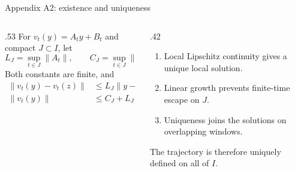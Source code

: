 \begin{frame}[t]{Appendix A2: existence and uniqueness}
\hypertarget{app:existence}{}
\begin{columns}[T,onlytextwidth]
  \begin{column}{.53\textwidth}
    For $v_t(y)=A_ty+B_t$ and compact $J\subset I$, let
    \begin{equation*}
      L_J=\sup_{t\in J}\|A_t\|,\qquad
      C_J=\sup_{t\in J}\|B_t\|.
    \end{equation*}
    Both constants are finite, and
    \begin{equation*}
      \begin{aligned}
        \|v_t(y)-v_t(z)\|&\leq L_J\|y-z\|,\\
        \|v_t(y)\|&\leq C_J+L_J\|y\|.
      \end{aligned}
    \end{equation*}
  \end{column}
  \begin{column}{.42\textwidth}
    \begin{enumerate}\setlength{\itemsep}{7pt}
      \item Local Lipschitz continuity gives a unique local solution.
      \item Linear growth prevents finite-time escape on $J$.
      \item Uniqueness joins the solutions on overlapping windows.
    \end{enumerate}
    The trajectory is therefore uniquely defined on all of $I$.
  \end{column}
\end{columns}
\end{frame}

